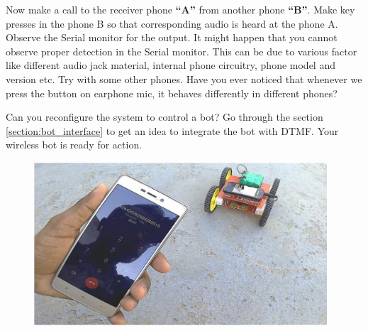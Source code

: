 \par Now make a call to the receiver phone \textbf{“A”} from another phone \textbf{“B”}. Make key presses in the phone B so that corresponding audio is heard at the phone A. Observe the Serial monitor for the output. It might happen that you cannot observe proper detection in the Serial monitor. This can be due to various factor like different audio jack material, internal phone circuitry, phone model and version etc. Try with some other phones. Have you ever noticed that whenever we press the button on earphone mic, it behaves differently in different phones?

\par Can you reconfigure the system to control a bot? Go through the section \ref{section:bot_interface} to get an idea to integrate the bot with \ac{DTMF}. Your wireless bot is ready for action.

\begin{figure}
	\centering
	\includegraphics[width=4.3in]{Images/DTMF/wireless_bot.png}
\end{figure}

